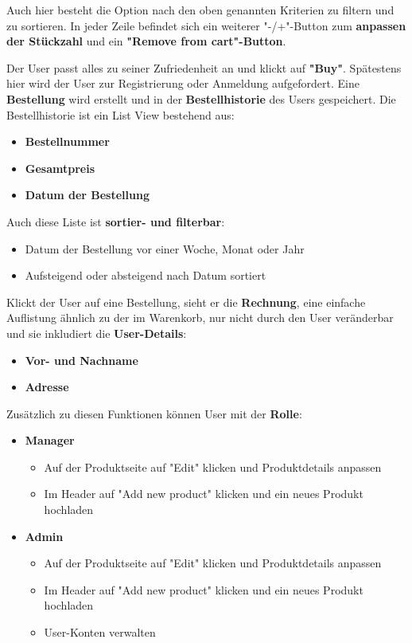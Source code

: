 \documentclass[12pt, a4paper]{scrreprt}
\begin{document}
		Auch hier besteht die Option nach den oben genannten Kriterien zu filtern und zu sortieren.
		In jeder Zeile befindet sich ein weiterer "-/+"-Button zum \textbf{anpassen der Stückzahl} und ein \textbf{"Remove from cart"-Button}.
		
		Der User passt alles zu seiner Zufriedenheit an und klickt auf \textbf{"Buy"}. Spätestens hier wird der User zur Registrierung oder Anmeldung aufgefordert. Eine \textbf{Bestellung} wird erstellt und in der \textbf{Bestellhistorie} des Users gespeichert. 
		Die Bestellhistorie ist ein List View bestehend aus:
		\begin{itemize}
			\item \textbf{Bestellnummer}
			\item \textbf{Gesamtpreis}
			\item \textbf{Datum der Bestellung}
		\end{itemize}
		Auch diese Liste ist \textbf{sortier- und filterbar}:
		\begin{itemize}
			\item Datum der Bestellung vor einer Woche, Monat oder Jahr
			\item Aufsteigend oder absteigend nach Datum sortiert 
		\end{itemize}
		
		Klickt der User auf eine Bestellung, sieht er die \textbf{Rechnung}, eine einfache Auflistung ähnlich zu der im Warenkorb, nur nicht durch den User veränderbar und sie inkludiert die \textbf{User-Details}:
		\begin{itemize}
			\item \textbf{Vor- und Nachname}
			\item \textbf{Adresse}
		\end{itemize}
		
		Zusätzlich zu diesen Funktionen können User mit der \textbf{Rolle}:
		\begin{itemize}
			\item \textbf{Manager}
				\begin{itemize}
					\item Auf der Produktseite auf "Edit" klicken und Produktdetails anpassen
					\item Im Header auf "Add new product" klicken und ein neues Produkt hochladen
				\end{itemize}
			\item \textbf{Admin}
				\begin{itemize}
					\item Auf der Produktseite auf "Edit" klicken und Produktdetails anpassen
					\item Im Header auf "Add new product" klicken und ein neues Produkt hochladen
					\item User-Konten verwalten
				\end{itemize}
		\end{itemize}
		
\end{document}
